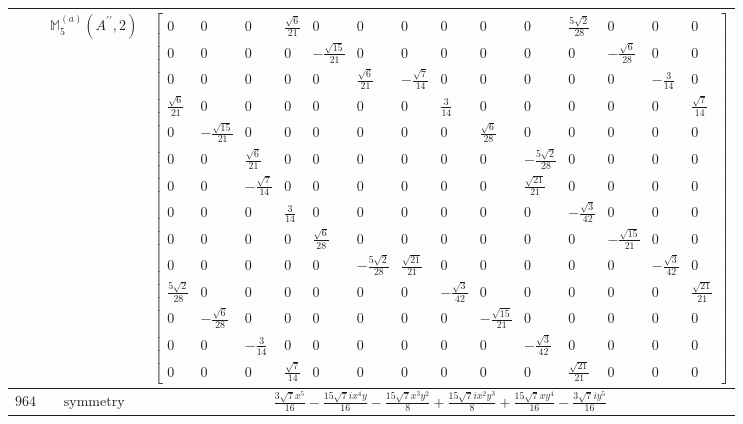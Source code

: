 \documentclass[fleqn,8pt,landscape]{jsarticle}
\begin{document}
\begin{longtable}{ccc}
$  $ & $ \mathbb{M}_{5}^{(a)}(A^{\prime\prime},2) $ & $ \begin{bmatrix} 0 & 0 & 0 & \frac{\sqrt{6}}{21} & 0 & 0 & 0 & 0 & 0 & 0 & \frac{5 \sqrt{2}}{28} & 0 & 0 & 0 \\ 0 & 0 & 0 & 0 & - \frac{\sqrt{15}}{21} & 0 & 0 & 0 & 0 & 0 & 0 & - \frac{\sqrt{6}}{28} & 0 & 0 \\ 0 & 0 & 0 & 0 & 0 & \frac{\sqrt{6}}{21} & - \frac{\sqrt{7}}{14} & 0 & 0 & 0 & 0 & 0 & - \frac{3}{14} & 0 \\ \frac{\sqrt{6}}{21} & 0 & 0 & 0 & 0 & 0 & 0 & \frac{3}{14} & 0 & 0 & 0 & 0 & 0 & \frac{\sqrt{7}}{14} \\ 0 & - \frac{\sqrt{15}}{21} & 0 & 0 & 0 & 0 & 0 & 0 & \frac{\sqrt{6}}{28} & 0 & 0 & 0 & 0 & 0 \\ 0 & 0 & \frac{\sqrt{6}}{21} & 0 & 0 & 0 & 0 & 0 & 0 & - \frac{5 \sqrt{2}}{28} & 0 & 0 & 0 & 0 \\ 0 & 0 & - \frac{\sqrt{7}}{14} & 0 & 0 & 0 & 0 & 0 & 0 & \frac{\sqrt{21}}{21} & 0 & 0 & 0 & 0 \\ 0 & 0 & 0 & \frac{3}{14} & 0 & 0 & 0 & 0 & 0 & 0 & - \frac{\sqrt{3}}{42} & 0 & 0 & 0 \\ 0 & 0 & 0 & 0 & \frac{\sqrt{6}}{28} & 0 & 0 & 0 & 0 & 0 & 0 & - \frac{\sqrt{15}}{21} & 0 & 0 \\ 0 & 0 & 0 & 0 & 0 & - \frac{5 \sqrt{2}}{28} & \frac{\sqrt{21}}{21} & 0 & 0 & 0 & 0 & 0 & - \frac{\sqrt{3}}{42} & 0 \\ \frac{5 \sqrt{2}}{28} & 0 & 0 & 0 & 0 & 0 & 0 & - \frac{\sqrt{3}}{42} & 0 & 0 & 0 & 0 & 0 & \frac{\sqrt{21}}{21} \\ 0 & - \frac{\sqrt{6}}{28} & 0 & 0 & 0 & 0 & 0 & 0 & - \frac{\sqrt{15}}{21} & 0 & 0 & 0 & 0 & 0 \\ 0 & 0 & - \frac{3}{14} & 0 & 0 & 0 & 0 & 0 & 0 & - \frac{\sqrt{3}}{42} & 0 & 0 & 0 & 0 \\ 0 & 0 & 0 & \frac{\sqrt{7}}{14} & 0 & 0 & 0 & 0 & 0 & 0 & \frac{\sqrt{21}}{21} & 0 & 0 & 0 \end{bmatrix} $ \\ \hline
$ 964 $ & $ \text{symmetry} $ & $ \frac{3 \sqrt{7} x^{5}}{16} - \frac{15 \sqrt{7} i x^{4} y}{16} - \frac{15 \sqrt{7} x^{3} y^{2}}{8} + \frac{15 \sqrt{7} i x^{2} y^{3}}{8} + \frac{15 \sqrt{7} x y^{4}}{16} - \frac{3 \sqrt{7} i y^{5}}{16} $ \\

\end{longtable}
\end{document}
